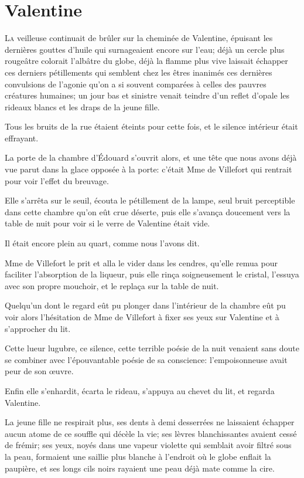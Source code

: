 \chapter{Valentine}

\lettrine{L}{a} veilleuse continuait de brûler sur la cheminée de Valentine, épuisant les dernières gouttes d'huile qui surnageaient encore sur l'eau; déjà un cercle plus rougeâtre colorait l'albâtre du globe, déjà la flamme plus vive laissait échapper ces derniers pétillements qui semblent chez les êtres inanimés ces dernières convulsions de l'agonie qu'on a si souvent comparées à celles des pauvres créatures humaines; un jour bas et sinistre venait teindre d'un reflet d'opale les rideaux blancs et les draps de la jeune fille. 

Tous les bruits de la rue étaient éteints pour cette fois, et le silence intérieur était effrayant. 

La porte de la chambre d'Édouard s'ouvrit alors, et une tête que nous avons déjà vue parut dans la glace opposée à la porte: c'était Mme de Villefort qui rentrait pour voir l'effet du breuvage. 

Elle s'arrêta sur le seuil, écouta le pétillement de la lampe, seul bruit perceptible dans cette chambre qu'on eût crue déserte, puis elle s'avança doucement vers la table de nuit pour voir si le verre de Valentine était vide. 

Il était encore plein au quart, comme nous l'avons dit. 

Mme de Villefort le prit et alla le vider dans les cendres, qu'elle remua pour faciliter l'absorption de la liqueur, puis elle rinça soigneusement le cristal, l'essuya avec son propre mouchoir, et le replaça sur la table de nuit. 

Quelqu'un dont le regard eût pu plonger dans l'intérieur de la chambre eût pu voir alors l'hésitation de Mme de Villefort à fixer ses yeux sur Valentine et à s'approcher du lit. 

Cette lueur lugubre, ce silence, cette terrible poésie de la nuit venaient sans doute se combiner avec l'épouvantable poésie de sa conscience: l'empoisonneuse avait peur de son œuvre. 

Enfin elle s'enhardit, écarta le rideau, s'appuya au chevet du lit, et regarda Valentine. 

La jeune fille ne respirait plus, ses dents à demi desserrées ne laissaient échapper aucun atome de ce souffle qui décèle la vie; ses lèvres blanchissantes avaient cessé de frémir; ses yeux, noyés dans une vapeur violette qui semblait avoir filtré sous la peau, formaient une saillie plus blanche à l'endroit où le globe enflait la paupière, et ses longs cils noirs rayaient une peau déjà mate comme la cire. 

